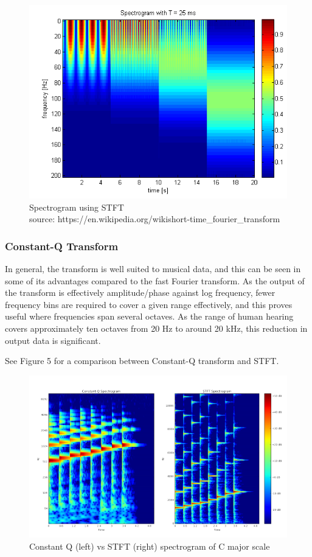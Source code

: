 \begin{figure}[h]
	\caption[Spectrogram using Short-Term Fourier Transform]{ Spectrogram using STFT \\
	source: https://en.wikipedia.org/wiki\/short-time\_fourier\_transform }
	\centering
	\includegraphics[width=1\textwidth, height=\textheight, keepaspectratio]{"resources/STFT_spectrogram"}
\end{figure}


\subsubsection{Constant-Q Transform}
In general, the transform is well suited to musical data, and this can be seen in some of its advantages compared to the fast Fourier transform. As the output of the transform is effectively amplitude/phase against log frequency, fewer frequency bins are required to cover a given range effectively, and this proves useful where frequencies span several octaves. As the range of human hearing covers approximately ten octaves from 20 Hz to around 20 kHz, this reduction in output data is significant. \cite{constant_q} \par
 See Figure 5 for a comparison between Constant-Q transform and STFT.


\begin{figure}[h]
	\caption[Constant Q vs STFT spectrogram of C major scale]{ Constant Q (left) vs STFT (right) spectrogram of C major scale}
	\centering
	\includegraphics[width=1\textwidth, height=\textheight, keepaspectratio]{"resources/Q_vs_STFT"}
\end{figure}